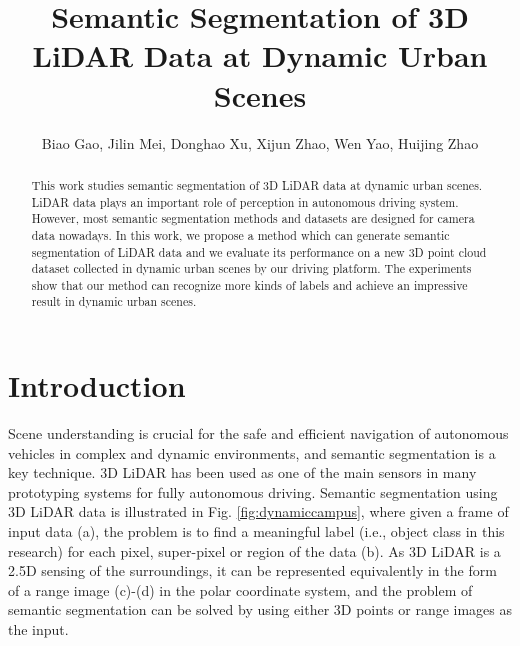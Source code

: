 





\title{Semantic Segmentation of 3D LiDAR Data at Dynamic Urban Scenes}




\author{\authorblockN
	{Biao Gao,
		Jilin Mei, 
		Donghao Xu,
		Xijun Zhao,
		Wen Yao,
		Huijing Zhao}
}



\maketitle

\begin{abstract}
This work studies semantic segmentation of 3D LiDAR data at dynamic urban scenes. LiDAR data plays an important role of perception in autonomous driving system. However, most semantic segmentation methods and datasets are designed for camera data nowadays. In this work, we propose a method which can generate semantic segmentation of LiDAR data and we evaluate its performance on a new 3D point cloud dataset collected in dynamic urban scenes by our driving platform. The experiments show that our method can recognize more kinds of labels and achieve an impressive result in dynamic urban scenes.
\end{abstract}


\section{Introduction}
	Scene understanding is crucial for the safe and efficient navigation of autonomous vehicles in complex and dynamic environments, and semantic segmentation is a key technique. 3D LiDAR has been used as one of the main sensors in many prototyping systems for fully autonomous driving\cite{urmson2008autonomous}. Semantic segmentation using 3D LiDAR data is illustrated in Fig. \ref{fig:dynamiccampus}, where given a frame of input data (a), the problem is to find a meaningful label (i.e., object class in this research) for each pixel, super-pixel or region of the data (b). As 3D LiDAR is a 2.5D sensing of the surroundings, it can be represented equivalently in the form of a range image (c)-(d) in the polar coordinate system, and the problem of semantic segmentation can be solved by using either 3D points or range images as the input.
	
